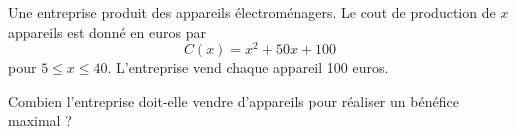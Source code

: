 
Une entreprise produit des appareils électroménagers. Le cout de production de $x$ appareils est donné en euros par $$C(x)=x^2+50x+100$$ pour $5 \leq x \leq 40$. L'entreprise vend chaque appareil 100 euros.

Combien l'entreprise doit-elle vendre d'appareils pour réaliser un bénéfice maximal ?


